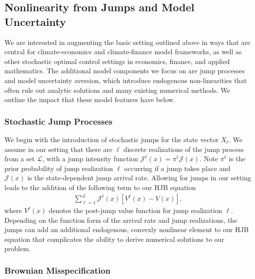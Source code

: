 \documentclass[12pt]{article}
\begin{document}
\subsection{Nonlinearity from Jumps and Model Uncertainty} \label{sec:nonlinearity} 

We are interested in augmenting the basic setting outlined above in ways that are central for climate-economics and climate-finance model frameworks, as well as other stochastic optimal control settings in economics, finance, and applied mathematics. The additional model components we focus on are jump processes and model uncertainty aversion, which introduce endogenous non-linearities that often rule out analytic solutions and many existing numerical methods. We outline the impact that these model features have below.

\subsubsection{Stochastic Jump Processes}

We begin with the introduction of stochastic jumps for the state vector $X_t$. We assume in our setting that there are $\ell$ discrete realizations of the jump process from a set $\mathcal{L}$, with a jump intensity function $\mathcal{J}^{\ell}(x) = \pi^\ell \mathcal{J}(x)$. Note $\pi^\ell$ is the prior probability of jump realization $\ell$ occurring if a jump takes place and $\mathcal{J}(x)$ is the state-dependent jump arrival rate. Allowing for jumps in our setting leads to the addition of the following term to our HJB equation
\begin{eqnarray*} \label{diffusion_no_distortion} 
\sum_{\ell = 1}^{\mathcal{L}} {\mathcal J}^\ell(x)  \left[ {V}^\ell(x)   - V (x) \right].
\end{eqnarray*} 
where ${V}^\ell(x)$ denotes the post-jump value function for jump realization $\ell$. Depending on the function form of the arrival rate and jump realizations, the jumps can add an additional endogenous, convexly nonlinear element to our HJB equation that complicates the ability to derive numerical solutions to our problem.

\subsubsection{Brownian Misspecification}
\end{document}
